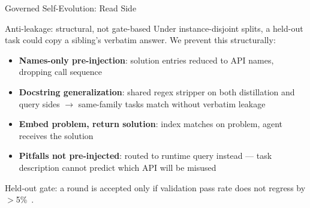 \documentclass{beamer}
\begin{document}
\begin{frame}{Governed Self-Evolution: Read Side}
    \begin{block}{Anti-leakage: structural, not gate-based}
        Under instance-disjoint splits, a held-out task could copy a sibling's verbatim answer. We prevent this structurally:
    \end{block}
    \begin{itemize}
        \item \textbf{Names-only pre-injection}: solution entries reduced to API names, dropping call sequence
        \item \textbf{Docstring generalization}: shared regex stripper on both distillation and query sides $\to$ same-family tasks match without verbatim leakage
        \item \textbf{Embed problem, return solution}: index matches on problem, agent receives the solution
        \item \textbf{Pitfalls not pre-injected}: routed to runtime query instead --- task description cannot predict which API will be misused
    \end{itemize}
    \vfill
    \footnotesize Held-out gate: a round is accepted only if validation pass rate does not regress by $>$5\%~\cite{yang2026skillopt}.
\end{frame}
\end{document}
